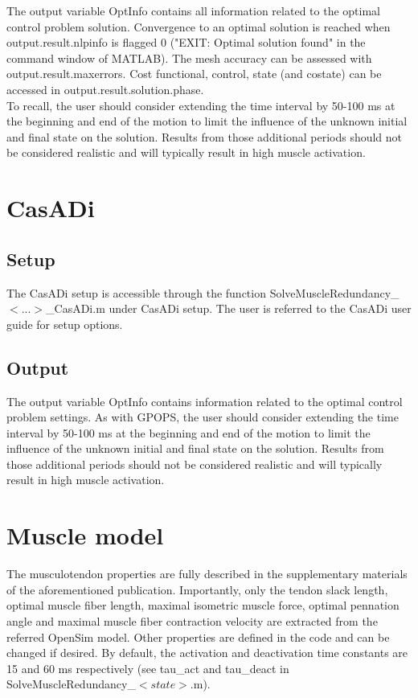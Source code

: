 \documentclass[a4paper,oneside,11pt]{article}
\begin{document}
The output variable OptInfo contains all information related to the optimal control problem solution. Convergence to an optimal solution is reached when output.result.nlpinfo is flagged 0 ("EXIT: Optimal solution found" in the command window of MATLAB). The mesh accuracy can be assessed with output.result.maxerrors. Cost functional, control, state (and costate) can be accessed in output.result.solution.phase. \\

To recall, the user should consider extending the time interval by 50-100 ms at the beginning and end of the motion to limit the influence of the unknown initial and final state on the solution. Results from those additional periods should not be considered realistic and will typically result in high muscle activation.

\section{CasADi}
\subsection{Setup}
The CasADi setup is accessible through the function SolveMuscleRedundancy_$<...>$_CasADi.m under CasADi setup. The user is referred to the CasADi user guide for setup options.

\subsection{Output}
The output variable OptInfo contains information related to the optimal control problem settings. As with GPOPS, the user should consider extending the time interval by 50-100 ms at the beginning and end of the motion to limit the influence of the unknown initial and final state on the solution. Results from those additional periods should not be considered realistic and will typically result in high muscle activation.

\section{Muscle model}

The musculotendon properties are fully described in the supplementary materials of the aforementioned publication. Importantly, only the tendon slack length, optimal muscle fiber length, maximal isometric muscle force, optimal pennation angle and maximal muscle fiber contraction velocity are extracted from the referred OpenSim model. Other properties are defined in the code and can be changed if desired. By default, the activation and deactivation time constants are 15 and 60 ms respectively (see tau_act and tau_deact in SolveMuscleRedundancy_$<state>$.m).
\end{document}

